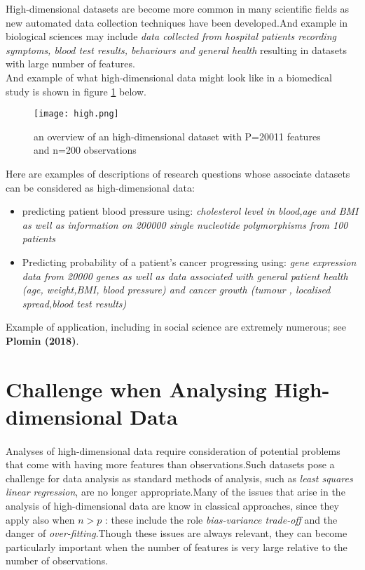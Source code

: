 \documentclass[12pt]{report}
\renewcommand{\emph}{\textit}
\begin{document}
	High-dimensional datasets are become more common in many scientific fields as new automated data collection techniques have been developed.And example in biological sciences may include \textit{data collected from hospital patients recording symptoms, blood test results, behaviours and general health} resulting in datasets with large number of features.\\
	And example of what high-dimensional data might look like in a biomedical study is shown in figure \ref{tab1} below.
	\begin{figure}[h!]
		\begin{center}
			\texttt{[image: high.png]}
		\end{center}
		\caption[An high-dimensional dataset.]{an overview of an high-dimensional dataset  with P=20011  features and n=200 observations}
		\label{tab1}
	\end{figure}
	Here are examples of descriptions of research questions whose associate datasets can be considered as high-dimensional data:
	\begin{itemize}
		\item predicting patient blood pressure using: \textit{cholesterol level in blood,age and BMI as well as information on 200000 single nucleotide polymorphisms from 100 patients}
		\item Predicting probability of a patient's cancer progressing using: \textit{gene expression data from 20000 genes as well as data associated with general patient health (age, weight,BMI, blood pressure) and cancer growth (tumour , localised spread,blood test results)}
	\end{itemize}
	Example of application, including in social science are extremely numerous; see \textbf{Plomin (2018)}.
	\section{Challenge when Analysing High-dimensional Data}
	\paragraph*{}
	Analyses of high-dimensional data require consideration of potential problems that come with having more features than observations.Such datasets pose a challenge for data analysis as standard methods of analysis, such as \emph{least squares linear regression}, are no longer appropriate.Many of the issues that arise in the analysis of high-dimensional data are know in classical approaches, since they apply also when $n>p$ :
	these include the role \emph{bias-variance trade-off} and the danger of \textit{over-fitting}.Though these issues are always relevant, they can become particularly important when the number of features is very large relative to the number of observations.
\end{document}
